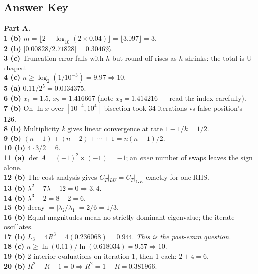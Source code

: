\clearpage
\subsection{Answer Key}

\begin{mcqbox}
\textbf{Part A.}\\[3pt]
\textbf{1 (b)} $m=\lfloor 2-\log_{10}(2\times0.04)\rfloor = \lfloor 3.097\rfloor = 3$.\\
\textbf{2 (b)} $|0.00828/2.71828| = 0.3046\%$.\\
\textbf{3 (c)} Truncation error falls with $h$ but round-off rises as $h$ shrinks: the total is U-shaped.\\
\textbf{4 (c)} $n \ge \log_2(1/10^{-3}) = 9.97 \Rightarrow 10$.\\
\textbf{5 (a)} $0.11/2^5 = 0.0034375$.\\
\textbf{6 (b)} $x_1 = 1.5$, $x_2 = 1.416667$ (note $x_3 = 1.414216$ --- read the index carefully).\\
\textbf{7 (b)} On $\ln x$ over $[10^{-4},10^4]$ bisection took 34 iterations vs false position's 126.\\
\textbf{8 (b)} Multiplicity $k$ gives linear convergence at rate $1-1/k = 1/2$.\\
\textbf{9 (b)} $(n-1)+(n-2)+\cdots+1 = n(n-1)/2$.\\
\textbf{10 (b)} $4\cdot3/2 = 6$.\\
\textbf{11 (a)} $\det A = (-1)^2 \times(-1) = -1$; an \emph{even} number of swaps leaves the sign alone.\\
\textbf{12 (b)} The cost analysis gives $C_T|_{LU} = C_T|_{GE}$ exactly for one RHS.\\
\textbf{13 (b)} $\lambda^2-7\lambda+12=0 \Rightarrow 3,4$.\\
\textbf{14 (b)} $\lambda^3 - 2 = 8-2 = 6$.\\
\textbf{15 (b)} decay $=|\lambda_2/\lambda_1| = 2/6 = 1/3$.\\
\textbf{16 (b)} Equal magnitudes mean no strictly dominant eigenvalue; the iterate oscillates.\\
\textbf{17 (b)} $L_3 = 4R^3 = 4(0.236068) = 0.944$. \emph{This is the past-exam question.}\\
\textbf{18 (c)} $n \ge \ln(0.01)/\ln(0.618034) = 9.57 \Rightarrow 10$.\\
\textbf{19 (b)} 2 interior evaluations on iteration 1, then 1 each: $2+4 = 6$.\\
\textbf{20 (b)} $R^2+R-1=0 \Rightarrow R^2 = 1-R = 0.381966$.\\

\end{mcqbox}
